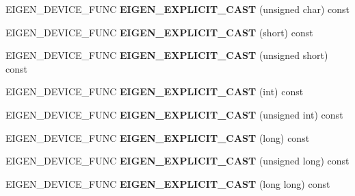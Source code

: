 \begin{DoxyCompactItemize}
E\+I\+G\+E\+N\+\_\+\+D\+E\+V\+I\+C\+E\+\_\+\+F\+U\+NC {\bfseries E\+I\+G\+E\+N\+\_\+\+E\+X\+P\+L\+I\+C\+I\+T\+\_\+\+C\+A\+ST} (unsigned char) const
\item 
\mbox{\label{struct_eigen_1_1half_a76abee321fb7d020343b7660dd03d138}} 
E\+I\+G\+E\+N\+\_\+\+D\+E\+V\+I\+C\+E\+\_\+\+F\+U\+NC {\bfseries E\+I\+G\+E\+N\+\_\+\+E\+X\+P\+L\+I\+C\+I\+T\+\_\+\+C\+A\+ST} (short) const
\item 
\mbox{\label{struct_eigen_1_1half_af3b8a6e7e62900a1be10c3f95d7d41d7}} 
E\+I\+G\+E\+N\+\_\+\+D\+E\+V\+I\+C\+E\+\_\+\+F\+U\+NC {\bfseries E\+I\+G\+E\+N\+\_\+\+E\+X\+P\+L\+I\+C\+I\+T\+\_\+\+C\+A\+ST} (unsigned short) const
\item 
\mbox{\label{struct_eigen_1_1half_a3f5643f9d3767ac0286a417a56160f49}} 
E\+I\+G\+E\+N\+\_\+\+D\+E\+V\+I\+C\+E\+\_\+\+F\+U\+NC {\bfseries E\+I\+G\+E\+N\+\_\+\+E\+X\+P\+L\+I\+C\+I\+T\+\_\+\+C\+A\+ST} (int) const
\item 
\mbox{\label{struct_eigen_1_1half_a90ab8f1d652236107341dd1cf8c95b11}} 
E\+I\+G\+E\+N\+\_\+\+D\+E\+V\+I\+C\+E\+\_\+\+F\+U\+NC {\bfseries E\+I\+G\+E\+N\+\_\+\+E\+X\+P\+L\+I\+C\+I\+T\+\_\+\+C\+A\+ST} (unsigned int) const
\item 
\mbox{\label{struct_eigen_1_1half_a3bfe6d8bbcd81e1107acd06885114238}} 
E\+I\+G\+E\+N\+\_\+\+D\+E\+V\+I\+C\+E\+\_\+\+F\+U\+NC {\bfseries E\+I\+G\+E\+N\+\_\+\+E\+X\+P\+L\+I\+C\+I\+T\+\_\+\+C\+A\+ST} (long) const
\item 
\mbox{\label{struct_eigen_1_1half_a65245f589dd3bddc7fa7a4bb234bb0ab}} 
E\+I\+G\+E\+N\+\_\+\+D\+E\+V\+I\+C\+E\+\_\+\+F\+U\+NC {\bfseries E\+I\+G\+E\+N\+\_\+\+E\+X\+P\+L\+I\+C\+I\+T\+\_\+\+C\+A\+ST} (unsigned long) const
\item 
\mbox{\label{struct_eigen_1_1half_a08c6740cef4d707ba0022fc6ad943a67}} 
E\+I\+G\+E\+N\+\_\+\+D\+E\+V\+I\+C\+E\+\_\+\+F\+U\+NC {\bfseries E\+I\+G\+E\+N\+\_\+\+E\+X\+P\+L\+I\+C\+I\+T\+\_\+\+C\+A\+ST} (long long) const
\item 
\mbox{\label{struct_eigen_1_1half_a4b3950b29acf30842cb71e1b74b8f8d0}} 

\end{DoxyCompactItemize}

